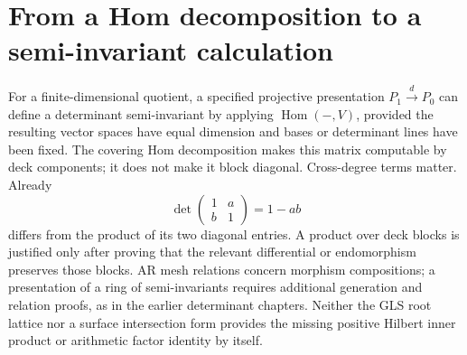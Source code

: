 \section{From a Hom decomposition to a semi-invariant calculation}
For a finite-dimensional quotient, a specified projective presentation
$P_1\xrightarrow{d}P_0$ can define a determinant semi-invariant by applying
$\operatorname{Hom}(-,V)$, provided the resulting vector spaces have equal
dimension and bases or determinant lines have been fixed. The covering Hom
decomposition makes this matrix computable by deck components; it does not
make it block diagonal. Cross-degree terms matter. Already
\[
 \det\begin{pmatrix}1&a\\b&1\end{pmatrix}=1-ab
\]
differs from the product of its two diagonal entries. A product over deck
blocks is justified only after proving that the relevant differential or
endomorphism preserves those blocks. AR mesh relations concern morphism
compositions; a presentation of a ring of semi-invariants requires additional
generation and relation proofs, as in the earlier determinant chapters.
Neither the GLS root lattice nor a surface intersection form provides the
missing positive Hilbert inner product or arithmetic factor identity by
itself.
